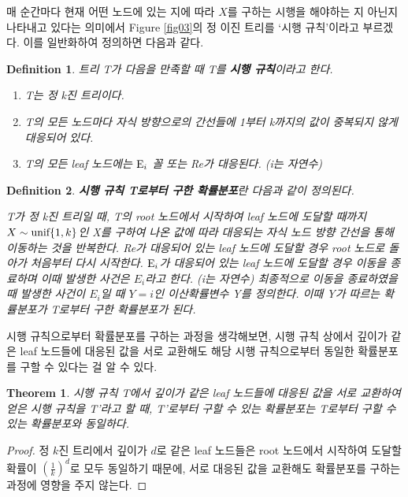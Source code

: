 \documentclass[11pt]{article}
\newtheorem*{definition}{Definition}
\newtheorem{theorem}{Theorem}
\begin{document}
매 순간마다 현재 어떤 노드에 있는 지에 따라 $X$를 구하는 시행을 해야하는 지 아닌지 나타내고 있다는 의미에서 Figure \ref{fig03}의 정 이진 트리를 `시행 규칙'이라고 부르겠다. 이를 일반화하여 정의하면 다음과 같다.

\singlespacing
\begin{definition}
트리 T가 다음을 만족할 때 T를 \textbf{시행 규칙}이라고 한다.
\begin{enumerate}
    \item T는 정 k진 트리이다.
    \item T의 모든 노드마다 자식 방향으로의 간선들에 1부터 k까지의 값이 중복되지 않게 대응되어 있다.
    \item T의 모든 leaf 노드에는 $\textnormal{E}_i$ 꼴 또는 \textnormal{Re}가 대응된다. (i는 자연수)\\
\end{enumerate}
\end{definition}
\doublespacing

\begin{definition}
\textbf{시행 규칙 T로부터 구한 확률분포}란 다음과 같이 정의된다.

T가 정 k진 트리일 때, T의 root 노드에서 시작하여 leaf 노드에 도달할 때까지 $X \sim \textnormal{unif}\{1, k\}$인 X를 구하여 나온 값에 따라 대응되는 자식 노드 방향 간선을 통해 이동하는 것을 반복한다. \textnormal{Re}가 대응되어 있는 leaf 노드에 도달할 경우 root 노드로 돌아가 처음부터 다시 시작한다. $\textnormal{E}_i$가 대응되어 있는 leaf 노드에 도달할 경우 이동을 종료하며 이때 발생한 사건은 $E_{i}$라고 한다. (i는 자연수) 최종적으로 이동을 종료하였을 때 발생한 사건이 $E_{i}$일 때 $Y = i$인 이산확률변수 Y를 정의한다. 이때 Y가 따르는 확률분포가 T로부터 구한 확률분포가 된다.
\end{definition}

시행 규칙으로부터 확률분포를 구하는 과정을 생각해보면, 시행 규칙 상에서 깊이가 같은 leaf 노드들에 대응된 값을 서로 교환해도 해당 시행 규칙으로부터 동일한 확률분포를 구할 수 있다는 걸 알 수 있다.

\singlespacing
\begin{theorem}
시행 규칙 T에서 깊이가 같은 leaf 노드들에 대응된 값을 서로 교환하여 얻은 시행 규칙을 T'라고 할 때, T'로부터 구할 수 있는 확률분포는 T로부터 구할 수 있는 확률분포와 동일하다.
\label{thm01}
\end{theorem}
\doublespacing

\begin{proof}
정 $k$진 트리에서 깊이가 $d$로 같은 leaf 노드들은 root 노드에서 시작하여 도달할 확률이 $\left(\frac{1}{k}\right)^{d}$로 모두 동일하기 때문에, 서로 대응된 값을 교환해도 확률분포를 구하는 과정에 영향을 주지 않는다.
\end{proof}
\end{document}
